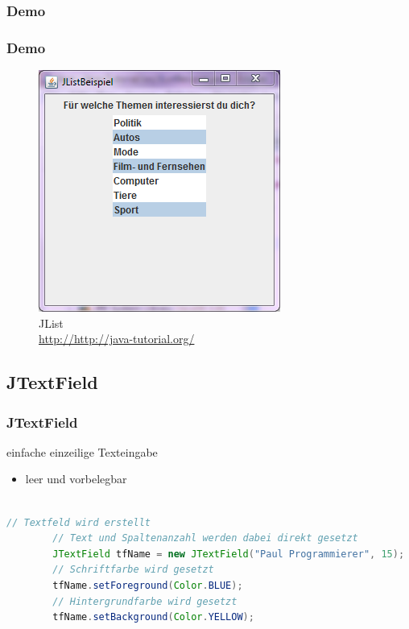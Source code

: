 \documentclass[xcolor=dvipsnames]{beamer}
\begin{document}
\subsubsection{Demo}
\begin{frame}
  \frametitle{Demo}
	\begin{figure}
		\includegraphics[scale=0.8]{images/jlist.PNG}
		\caption{JList \\ \tiny{\textcolor{gray}{\url{http://http://java-tutorial.org/}}}}
		\end{figure}
\end{frame}



\subsection{JTextField}
\begin{frame}  %
  \frametitle{JTextField
} %
  \begin{block}{einfache einzeilige Texteingabe}
	  \begin{itemize}
		\item leer und vorbelegbar
	  \end{itemize}
  \end{block}

\begin{lstlisting}[language=java,basicstyle=\scriptsize\ttfamily]

// Textfeld wird erstellt
        // Text und Spaltenanzahl werden dabei direkt gesetzt
        JTextField tfName = new JTextField("Paul Programmierer", 15);
        // Schriftfarbe wird gesetzt
        tfName.setForeground(Color.BLUE);
        // Hintergrundfarbe wird gesetzt
        tfName.setBackground(Color.YELLOW);

\end{lstlisting}

\end{frame}
\end{document}
